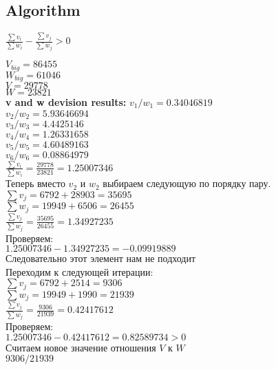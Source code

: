 \documentclass[a4paper,12pt]{article} %
\begin{document}
\subsection{Algorithm}

$\displaystyle \frac{\displaystyle \sum v_i}{\displaystyle \sum w_i} - \frac{\displaystyle \sum v_j}{\displaystyle \sum w_j} > 0$ \\
\begin{flushleft}
$V_{big} = 86455$ \\
$W_{big} = 61046$ \\
$V = 29778$ \\
$W = 23821$ \\
\vspace{5mm}
\textbf{v and w devision results:}\newline \smallskip
$v_1 / w_1 = 0.34046819$ \\
$v_2 / w_2 = 5.93646694$ \\
$v_3 / w_3 = 4.4425146$ \\
$v_4 / w_4 = 1.26331658$ \\
$v_5 / w_5 = 4.60489163$ \\
$v_6 / w_6 = 0.08864979$ \\

$\displaystyle \frac{\sum v_i}{\sum w_i} = \frac{29778}{23821} = 1.25007346$ \\
\vspace{5mm}
Теперь вместо $v_2$ и $w_2$ выбираем следующую по порядку пару. \smallskip
$\sum v_j = 6792 + 28903 = 35695$ \\
\smallskip
$\sum w_j = 19949 + 6506 = 26455$ \\ \bigskip
$\displaystyle \frac{\sum v_j}{\sum w_j} = \frac{35695}{26455} = 1.34927235$ \\
\smallskip
Проверяем: \\
\smallskip
$1.25007346 - 1.34927235 = -0.09919889$ \quad \\
Следовательно этот элемент нам не подходит \\
\bigskip
Переходим к следующей итерации: \\
$\sum v_j = 6792 + 2514 = 9306$ \\
\smallskip
$\sum w_j = 19949 + 1990 = 21939$ \\ \bigskip
$\displaystyle \frac{\sum v_j}{\sum w_j} = \frac{9306}{21939} = 0.42417612$ \\
\smallskip
Проверяем: \\
\smallskip
$1.25007346 - 0.42417612 = 0.82589734 > 0$ \\
\bigskip
Считаем новое значение отношения $V$ к $W$ \\
\smallskip
$9306 / 21939$
\end{flushleft}
\vspace{1cm}




%
%
%
%
\end{document}

